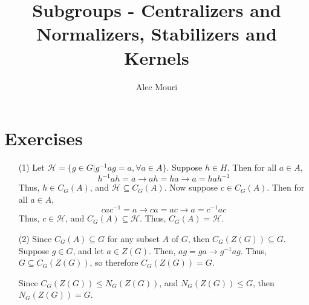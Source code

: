 \documentclass[12pt]{article}
\begin{document}
\title{Subgroups - Centralizers and Normalizers, Stabilizers and Kernels}
\author{Alec Mouri}

\maketitle
\section*{Exercises}
\begin{itemize}
\item[(1)]
Let $\mathcal{H} = \{ g \in G | g^{-1}ag = a, \forall a \in A \}$. Suppose $h \in H$. Then for all $a \in A$, 
$$h^{-1}ah = a \rightarrow ah = ha \rightarrow a = hah^{-1}$$
Thus, $h \in C_G(A)$, and $\mathcal{H} \subseteq C_G(A)$. Now suppose $c \in C_G(A)$. Then for all $a \in A$,
$$cac^{-1} = a \rightarrow ca = ac \rightarrow a = c^{-1}ac$$
Thus, $c \in \mathcal{H}$, and $C_G(A) \subseteq \mathcal{H}$. Thus, $C_G(A) = \mathcal{H}$.
\item[(2)]
Since $C_G(A) \subseteq G$ for any subset $A$ of $G$, then $C_G(Z(G)) \subseteq G$. Suppose $g \in G$, and let $a \in Z(G)$. Then, $ag = ga \rightarrow g^{-1}ag$. Thus, $G \subseteq C_G(Z(G))$, so therefore $C_G(Z(G)) = G$.

Since $C_G(Z(G)) \leq N_G(Z(G))$, and $N_G(Z(G)) \leq G$, then $N_G(Z(G)) = G$.
\end{itemize}
\end{document}
